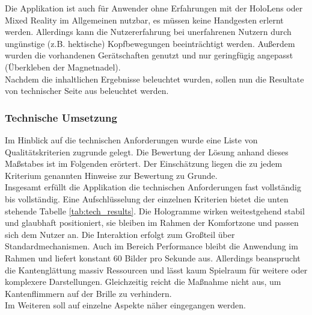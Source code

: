 Die Applikation ist auch für Anwender ohne Erfahrungen mit der HoloLens oder Mixed Reality im Allgemeinen nutzbar, es müssen keine Handgesten erlernt werden. Allerdings kann die Nutzererfahrung bei unerfahrenen Nutzern durch ungünstige (z.B. hektische) Kopfbewegungen beeinträchtigt werden. Außerdem wurden die vorhandenen Gerätschaften genutzt und nur geringfügig angepasst (Überkleben der Magnetnadel).\\

Nachdem die inhaltlichen Ergebnisse beleuchtet wurden, sollen nun die Resultate von technischer Seite aus beleuchtet werden.

\subsubsection{Technische Umsetzung}
Im Hinblick auf die technischen Anforderungen wurde eine Liste von Qualitätskriterien zugrunde gelegt. Die Bewertung der Lösung anhand dieses Maßstabes ist im Folgenden erörtert. Der Einschätzung liegen die zu jedem Kriterium genannten Hinweise zur Bewertung zu Grunde.\\

Insgesamt erfüllt die Applikation die technischen Anforderungen fast vollständig bis vollständig. Eine Aufschlüsselung der einzelnen Kriterien bietet die unten stehende Tabelle \ref{tab:tech_results}. Die Hologramme wirken weitestgehend stabil und glaubhaft positioniert, sie bleiben im Rahmen der Komfortzone und passen sich dem Nutzer an. Die Interaktion erfolgt zum Großteil über Standardmechanismen. Auch im Bereich Performance bleibt die Anwendung im Rahmen und liefert konstant 60 Bilder pro Sekunde aus. Allerdings beansprucht die Kantenglättung massiv Ressourcen und lässt kaum Spielraum für weitere oder komplexere Darstellungen. Gleichzeitig reicht die Maßnahme nicht aus, um Kantenflimmern auf der Brille zu verhindern.\\

Im Weiteren soll auf einzelne Aspekte näher eingegangen werden.\\
 
